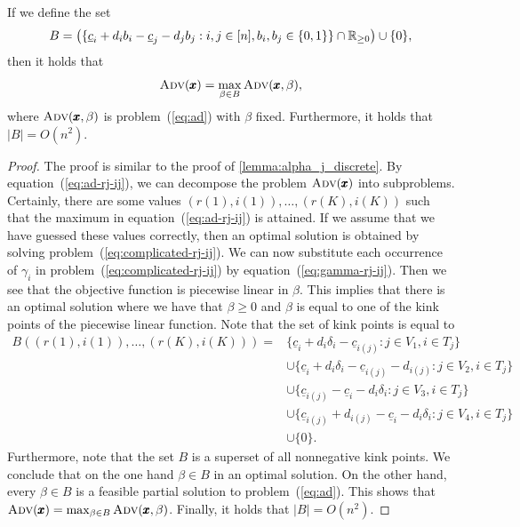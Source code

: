 \begin{lemma}
\label{lemma:beta_discrete}
  If we define the set
  \[ B = \left( \{ \underline{c}_i + d_i b_i - \underline{c}_j - d_j b_j : i,j\in[n], b_i,b_j\in\{0,1\} \} \cap \mathbb{R}_{\geq 0}\right) \cup \{0\}, \]
  then it holds that
  \[ \textsc{Adv}(\pmb{x}) = \max_{\beta \in B} \textsc{Adv}(\pmb{x},\beta), \]
  where $\textsc{Adv}(\pmb{x},\beta)$ is problem~(\ref{eq:ad}) with $\beta$ fixed. Furthermore, it holds that $|B| = O(n^2)$.
\end{lemma}
\begin{proof}
The proof is similar to the proof of \cref{lemma:alpha_j_discrete}. By equation~(\ref{eq:ad-rj-ij}), we can decompose the problem $\textsc{Adv}(\pmb x)$ into subproblems. Certainly, there are some values $(r(1), i(1)), \dots, (r(K), i(K))$ such that the maximum in equation~(\ref{eq:ad-rj-ij}) is attained. If we assume that we have guessed these values correctly, then an optimal solution is obtained by solving problem~(\ref{eq:complicated-rj-ij}). We can now substitute each occurrence of $\gamma_i$ in problem~(\ref{eq:complicated-rj-ij}) by equation~(\ref{eq:gamma-rj-ij}). Then we see that the objective function is piecewise linear in $\beta$. 
This implies that there is an optimal solution where we have that $\beta \geq 0$ and $\beta$ is equal to one of the kink points of the piecewise linear function. Note that the set of kink points is equal to 
\begin{align*}
B((r(1),i(1)),\ldots,(r(K),i(K)))  = &\{ \underline{c}_i + d_i\delta_i - \underline{c}_{i(j)} : j \in V_1, i\in T_j\} \\
& \cup  \{ \underline{c}_i + d_i\delta_i - \underline{c}_{i(j)} - d_{i(j)} : j \in V_2, i\in T_j\} \\
& \cup  \{ \underline{c}_{i(j)} - \underline{c}_i - d_i\delta_i  : j \in V_3, i\in T_j\} \\
& \cup  \{  \underline{c}_{i(j)} + d_{i(j)} - \underline{c}_i - d_i\delta_i : j \in V_4, i\in T_j\} \\
& \cup \{0\}.
\end{align*}
Furthermore, note that the set $B$ is a superset of all nonnegative kink points. We conclude that on the one hand $\beta \in B$ in an optimal solution. On the other hand, every $\beta \in B$ is a feasible partial solution to problem~(\ref{eq:ad}). This shows that $\textsc{Adv}(\pmb{x}) = \max_{\beta \in B} \textsc{Adv}(\pmb{x},\beta)$. Finally, it holds that $|B| = O(n^2)$. 
\end{proof}

